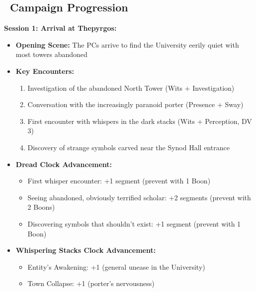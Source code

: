 \documentclass[11pt]{article}
\begin{document}
\subsection*{\faBook\ Campaign Progression}

\textbf{Session 1: Arrival at Thepyrgos:}
\begin{itemize}
    \item \textbf{Opening Scene:} The PCs arrive to find the University eerily quiet with most towers abandoned
    \item \textbf{Key Encounters:}
    \begin{enumerate}
        \item Investigation of the abandoned North Tower (Wits + Investigation)
        \item Conversation with the increasingly paranoid porter (Presence + Sway)
        \item First encounter with whispers in the dark stacks (Wits + Perception, DV 3)
        \item Discovery of strange symbols carved near the Synod Hall entrance
    \end{enumerate}
    \item \textbf{Dread Clock Advancement:}
    \begin{itemize}
        \item First whisper encounter: +1 segment (prevent with 1 Boon)
        \item Seeing abandoned, obviously terrified scholar: +2 segments (prevent with 2 Boons)
        \item Discovering symbols that shouldn't exist: +1 segment (prevent with 1 Boon)
    \end{itemize}
    \item \textbf{Whispering Stacks Clock Advancement:}
    \begin{itemize}
        \item Entity's Awakening: +1 (general unease in the University)
        \item Town Collapse: +1 (porter's nervousness)
    \end{itemize}
\end{itemize}
\end{document}
